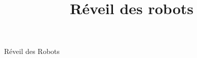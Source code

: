 \documentclass{article}
\title{Réveil des robots}
\begin{document}
	\LARGE{Réveil des Robots}

	
	
	
\end{document}
